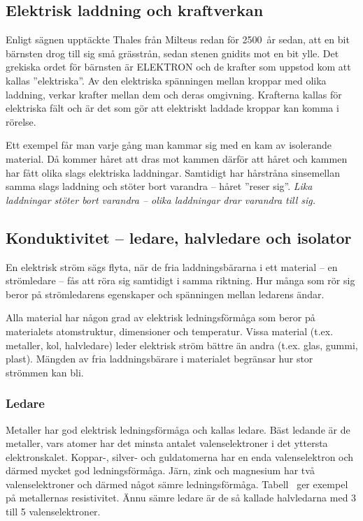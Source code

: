\subsection{Elektrisk laddning och kraftverkan}

Enligt sägnen upptäckte Thales från Milteus redan för 2500~år sedan, att en bit
bärnsten drog till sig små grässtrån, sedan stenen gnidits mot en bit ylle.
Det grekiska ordet för bärnsten är ELEKTRON och de krafter som uppstod kom att
kallas ''elektriska''.
Av den elektriska spänningen mellan kroppar med olika laddning, verkar krafter
mellan dem och deras omgivning.
Krafterna kallas för elektriska fält och är det som gör att elektriskt laddade
kroppar kan komma i rörelse.


Ett exempel får man varje gång man kammar sig med en kam av isolerande material.
Då kommer håret att dras mot kammen därför att håret och kammen har
fått olika slags elektriska laddningar.
Samtidigt har hårstråna sinsemellan samma slags laddning och stöter bort
varandra -- håret ''reser sig''.
\emph{Lika laddningar stöter bort varandra -- olika laddningar drar varandra till sig.}

\subsection{Konduktivitet -- ledare, halvledare och isolator}
\label{konduktivitet}

En elektrisk ström sägs flyta, när de fria laddningsbärarna i ett material -- en
strömledare -- fås att röra sig samtidigt i samma riktning.
Hur många som rör sig beror på strömledarens egenskaper och spänningen mellan
ledarens ändar.

Alla material har någon grad av elektrisk ledningsförmåga som beror på
materialets atomstruktur, dimensioner och temperatur.
Vissa material (t.ex. metaller, kol, halvledare) leder elektrisk ström bättre
än andra (t.ex. glas, gummi, plast).
Mängden av fria laddningsbärare i materialet begränsar hur stor strömmen kan
bli.

\subsubsection{Ledare}
\label{ledare}

Metaller har god elektrisk ledningsförmåga och kallas ledare.
Bäst ledande är de metaller, vars atomer har det minsta antalet
valenselektroner i det yttersta elektronskalet.
Koppar-, silver- och guldatomerna har en enda valenselektron och därmed mycket
god ledningsförmåga.
Järn, zink och magnesium har två valenselektroner och därmed något sämre
ledningsförmåga.
Tabell~ ger exempel på metallernas resistivitet.
Ännu sämre ledare är de så kallade halvledarna med 3 till 5 valenselektroner.

